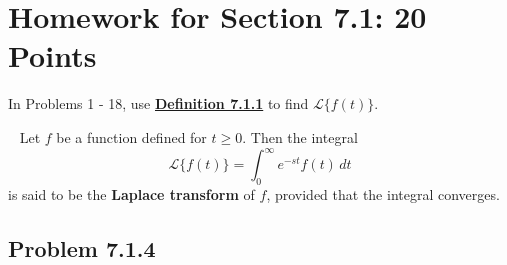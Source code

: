 \section*{Homework for Section 7.1: 20 Points}
\vspace{-0.5cm}

In Problems 1 - 18, use \hyperlink{def:Laplace 7.1.1}{\textbf{Definition 7.1.1}} to find $\mathscr{L} \{ f(t) \}$.

\begin{boxeddefinition}[7.1.1] \hypertarget{def:Laplace 7.1.1}{}
  \ \newline
  Let $f$ be a function defined for $t \geq 0$. Then the integral
    \begin{equation}
        \mathscr{L}\{f(t)\} = \int_{0}^{\infty} e^{-st} f(t) \, dt
    \end{equation}
  is said to be the \textbf{Laplace transform} of $f$, provided that the integral converges.  
\end{boxeddefinition}

  \subsection*{Problem 7.1.4}
  \vspace{-0.5cm}

